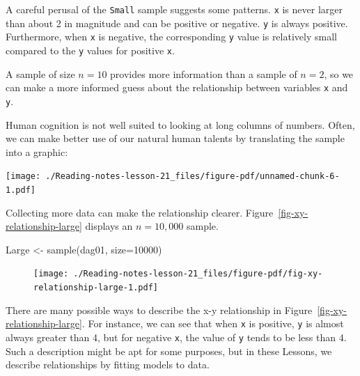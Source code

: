 \documentclass[
  letterpaper,
  DIV=11,
  numbers=noendperiod,
  oneside]{scrreprt}
\newenvironment{Shaded}{\begin{snugshade}}{\end{snugshade}}
\newcommand{\AttributeTok}[1]{\textcolor[rgb]{0.40,0.45,0.13}{#1}}
\newcommand{\DecValTok}[1]{\textcolor[rgb]{0.68,0.00,0.00}{#1}}
\newcommand{\FunctionTok}[1]{\textcolor[rgb]{0.28,0.35,0.67}{#1}}
\newcommand{\NormalTok}[1]{\textcolor[rgb]{0.00,0.23,0.31}{#1}}
\newcommand{\OtherTok}[1]{\textcolor[rgb]{0.00,0.23,0.31}{#1}}
\begin{document}
A careful perusal of the \texttt{Small} sample suggests some patterns.
\texttt{x} is never larger than about 2 in magnitude and can be positive
or negative. \texttt{y} is always positive. Furthermore, when \texttt{x}
is negative, the corresponding \texttt{y} value is relatively small
compared to the \texttt{y} values for positive \texttt{x}.

A sample of size \(n=10\) provides more information than a sample of
\(n=2\), so we can make a more informed guess about the relationship
between variables \texttt{x} and \texttt{y}.

Human cognition is not well suited to looking at long columns of
numbers. Often, we can make better use of our natural human talents by
translating the sample into a graphic:

\texttt{[image: ./Reading-notes-lesson-21\_files/figure-pdf/unnamed-chunk-6-1.pdf]}

Collecting more data can make the relationship clearer.
Figure~\ref{fig-xy-relationship-large} displays an \(n=10,000\) sample.

\begin{Shaded}
\begin{Highlighting}[]
\NormalTok{Large }\OtherTok{\textless{}{-}} \FunctionTok{sample}\NormalTok{(dag01, }\AttributeTok{size=}\DecValTok{10000}\NormalTok{)}
\end{Highlighting}
\end{Shaded}

\begin{figure}


{\centering \texttt{[image: ./Reading-notes-lesson-21\_files/figure-pdf/fig-xy-relationship-large-1.pdf]}

}

\end{figure}

There are many possible ways to describe the x-y relationship in
Figure~\ref{fig-xy-relationship-large}. For instance, we can see that
when \texttt{x} is positive, \texttt{y} is almost always greater than 4,
but for negative \texttt{x}, the value of \texttt{y} tends to be less
than 4. Such a description might be apt for some purposes, but in these
Lessons, we describe relationships by fitting models to data.
\end{document}
